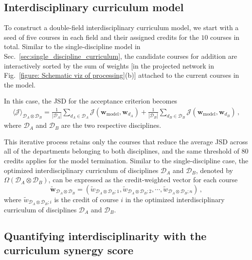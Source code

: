 \documentclass{bmcart}
\begin{document}
\subsection{Interdisciplinary curriculum model}
\label{sec:interdisciplinary_curriculum}

To construct a double-field interdisciplinary curriculum model, we start with a seed of five courses in each field and their assigned credits for the $10$ courses in total. 
Similar to the single-discipline model in Sec.~\ref{sec:single_discipline_curriculum}, the candidate courses for addition are interactively sorted by the sum of weights [in the projected network in Fig.~\ref{figure: Schematic viz of processing}(b)] attached to the current courses in the model. 

In this case, the JSD for the acceptance criterion becomes
\begin{align}
\langle \mathcal{J} \rangle_{\mathcal{D}_A \otimes \mathcal{D}_B}  = 
\frac{1}{|\mathcal{D}_A|} \sum_{d_A \in \mathcal{D}_A} \mathcal{J}(\mathbf{w}_\mathrm{model}, \mathbf{w}_{d_A}) + 
\frac{1}{|\mathcal{D}_B|} \sum_{d_B \in \mathcal{D}_B} \mathcal{J}(\mathbf{w}_\mathrm{model}, \mathbf{w}_{d_B}) \,,
\end{align}
where \( \mathcal{D}_A \) and \( \mathcal{D}_B \) are  
the two respective disciplines.

This iterative process retains only the courses that reduce the average JSD across all of the departments belonging to both disciplines, and the same threshold of $80$ credits applies for the model termination. Similar to the single-discipline case, the optimized interdisciplinary curriculum of disciplines $\mathcal{D}_A$ and $\mathcal{D}_B$, denoted by $\Omega \left( \mathcal{D}_A \otimes \mathcal{D}_B \right)$, can be expressed as the credit-weighted vector for each course
\begin{equation}
\tilde{\mathbf{w}}_{\mathcal{D}_A \otimes \mathcal{D}_B } = \left( \tilde{w}_{\mathcal{D}_A \otimes \mathcal{D}_B;1}, \tilde{w}_{\mathcal{D}_A \otimes \mathcal{D}_B;2}, \cdots,  \tilde{w}_{\mathcal{D}_A \otimes \mathcal{D}_B;n} \right) \,,
\label{eq:interdisciplinary_opt_weight_vector}
\end{equation}
where $\tilde{w}_{\mathcal{D}_A \otimes \mathcal{D}_B;i}$ is the credit of course $i$ in the optimized interdisciplinary curriculum of disciplines $\mathcal{D}_A$ and $\mathcal{D}_B$.

\subsection{Quantifying interdisciplinarity with the curriculum synergy score}
\end{document}
